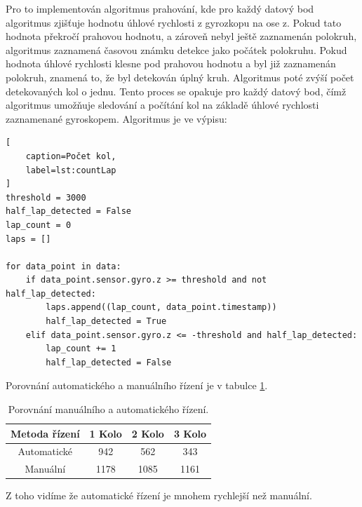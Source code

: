 Pro
to implementován algoritmus prahování, kde pro každý datový bod algoritmus zjišťuje hodnotu 
úhlové rychlosti z gyrozkopu na ose z. Pokud tato hodnota překročí prahovou hodnotu, a 
zároveň nebyl ještě zaznamenán polokruh, algoritmus zaznamená časovou známku detekce jako 
počátek polokruhu. Pokud hodnota úhlové rychlosti klesne pod prahovou hodnotu 
a byl již zaznamenán polokruh, znamená to, že byl detekován úplný kruh. 
Algoritmus poté zvýší počet detekovaných kol o jednu.
Tento proces se opakuje pro každý datový bod, čímž algoritmus umožňuje sledování a 
počítání kol na základě úhlové rychlosti zaznamenané gyroskopem.
Algoritmus je ve výpisu:
\begin{lstlisting}[
	caption=Počet kol,
	label=lst:countLap
]
threshold = 3000
half_lap_detected = False
lap_count = 0
laps = []

for data_point in data:
    if data_point.sensor.gyro.z >= threshold and not half_lap_detected:
        laps.append((lap_count, data_point.timestamp))
        half_lap_detected = True
    elif data_point.sensor.gyro.z <= -threshold and half_lap_detected:
        lap_count += 1
        half_lap_detected = False
\end{lstlisting}

Porovnání automatického a manuálního řízení je v tabulce \ref{tab:Comparison}.
\begin{table}[!h]
    \centering
    \begin{tabular}{cccc}
        \hline
        \textbf{Metoda řízení} & \textbf{1 Kolo} & \textbf{2 Kolo} & \textbf{3 Kolo} \\
        \hline
        Automatické           & 942       & 562 & 343          \\
        Manuální 			  & 1178       & 1085 & 1161           \\
        \hline
    \end{tabular}
    \caption{Porovnání manuálního a automatického řízení.}
    \label{tab:Comparison}
\end{table}

Z toho vidíme že automatické řízení je mnohem rychlejší než manuální.
\endinput
